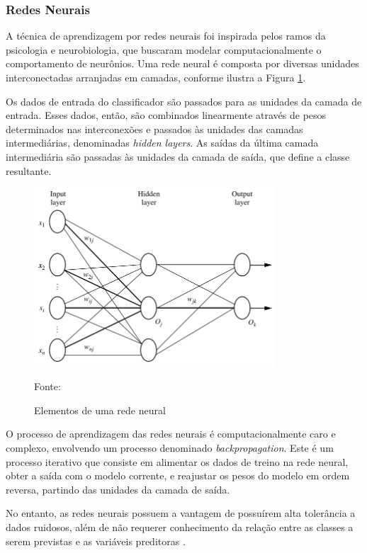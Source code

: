 \subsubsection{Redes Neurais}
A técnica de aprendizagem por redes neurais foi inspirada pelos ramos da psicologia e neurobiologia, que buscaram modelar computacionalmente o comportamento de neurônios. Uma rede neural é composta por diversas unidades interconectadas arranjadas em camadas, conforme ilustra a Figura \ref{fig:elem_rede_neural}. 

Os dados de entrada do classificador são passados para as unidades da camada de entrada. Esses dados, então, são combinados linearmente através de pesos determinados nas interconexões e passados às unidades das camadas intermediárias, denominadas \textit{hidden layers}. As saídas da última camada intermediária são passadas às unidades da camada de saída, que define a classe resultante.

\begin{figure}[h]
	\centering
	\caption{Elementos de uma rede neural}
  \includegraphics[width=0.8\textwidth]{imagens/elem_rede_neural.png}
  \label{fig:elem_rede_neural}  
  
  Fonte: \cite{han2005}
\end{figure}

O processo de aprendizagem das redes neurais é computacionalmente caro e complexo, envolvendo um processo denominado \textit{backpropagation}. Este é um processo iterativo que consiste em alimentar os dados de treino na rede neural, obter a saída com o modelo corrente, e reajustar os pesos do modelo em ordem reversa, partindo das unidades da camada de saída.

No entanto, as redes neurais possuem a vantagem de possuírem alta tolerância a dados ruidosos, além de não requerer conhecimento da relação entre as classes a serem previstas e as variáveis preditoras \cite{han2005}.

